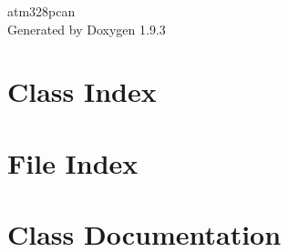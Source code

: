 \documentclass[twoside]{book}
\newcommand{\+}{\discretionary{\mbox{\scriptsize$\hookleftarrow$}}{}{}}
\newcommand{\clearemptydoublepage}{%
    \newpage{\pagestyle{empty}\cleardoublepage}%
  }
\begin{document}
  \raggedbottom
    \hypersetup{pageanchor=false,
                bookmarksnumbered=true,
                pdfencoding=unicode
               }
  \begin{titlepage}
  \vspace*{7cm}
  \begin{center}%
  {\Large atm328pcan}\\
  \vspace*{1cm}
  {\large Generated by Doxygen 1.9.3}\\
  \end{center}
  \end{titlepage}
  \clearemptydoublepage
  \tableofcontents
  \clearemptydoublepage
  \hypersetup{pageanchor=true}
\chapter{Class Index}

\chapter{File Index}

\chapter{Class Documentation}






























\end{document}
